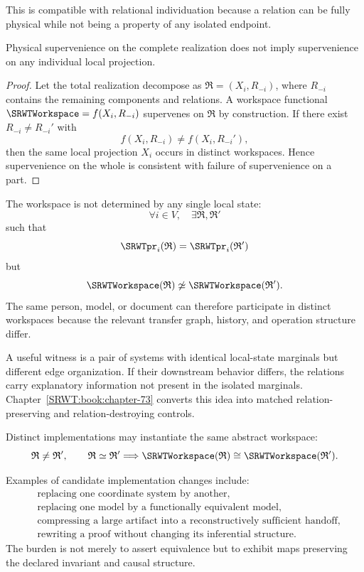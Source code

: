 This is compatible with relational individuation because a relation can be
fully physical while not being a property of any isolated endpoint.

\begin{SRWTproposition}\label{SRWT:prop:supervenience-relational}
Physical supervenience on the complete realization does not imply
supervenience on any individual local projection.
\end{SRWTproposition}

\begin{proof}
Let the total realization decompose as \(\mathfrak R=(X_i,R_{-i})\), where
\(R_{-i}\) contains the remaining components and relations. A workspace
functional \(\SRWTWorkspace=f(X_i,R_{-i})\) supervenes on \(\mathfrak R\) by
construction. If there exist \(R_{-i}\neq R_{-i}'\) with
\[
f(X_i,R_{-i})\neq f(X_i,R_{-i}'),
\]
then the same local projection \(X_i\) occurs in distinct workspaces. Hence
supervenience on the whole is consistent with failure of supervenience on a
part.
\end{proof}


The workspace is not determined by any single local state:
\[
\forall i\in V,
\quad
\exists\mathfrak R,\mathfrak R'
\]
such that
\[
\SRWTpr_i(\mathfrak R)=\SRWTpr_i(\mathfrak R')
\]
but
\[
\SRWTWorkspace(\mathfrak R)\not\simeq\SRWTWorkspace(\mathfrak R').
\]
The same person, model, or document can therefore participate in distinct
workspaces because the relevant transfer graph, history, and operation
structure differ.

A useful witness is a pair of systems with identical local-state marginals but
different edge organization. If their downstream behavior differs, the
relations carry explanatory information not present in the isolated marginals.
Chapter~\ref{SRWT:book:chapter-73} converts this idea into matched relation-preserving and
relation-destroying controls.


Distinct implementations may instantiate the same abstract workspace:
\[
\mathfrak R\neq\mathfrak R',
\qquad
\mathfrak R\simeq\mathfrak R'
\Longrightarrow
\SRWTWorkspace(\mathfrak R)\cong\SRWTWorkspace(\mathfrak R').
\]

Examples of candidate implementation changes include:
\[
\begin{aligned}
&\text{replacing one coordinate system by another},\\
&\text{replacing one model by a functionally equivalent model},\\
&\text{compressing a large artifact into a reconstructively sufficient handoff},\\
&\text{rewriting a proof without changing its inferential structure}.
\end{aligned}
\]
The burden is not merely to assert equivalence but to exhibit maps preserving
the declared invariant and causal structure.

